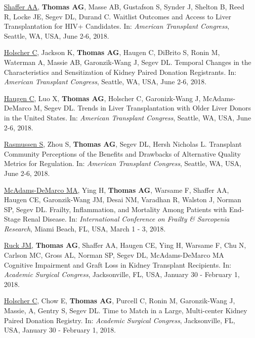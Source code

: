 \documentclass[10pt]{article}
\makeatletter
\newlength{\bibhang}
\newlength{\bibsep}
 {\@listi \global\bibsep\itemsep \global\advance\bibsep by\parsep}
\newenvironment{bibenum*}
  {\renewcommand\labelenumi{[\theenumi]}%
   \etaremune[
     topsep=0pt,
     itemsep=\bibsep,
     parsep=0pt,partopsep=0pt,
     itemindent=-\bibhang,
     leftmargin={\bibhang+\widthof{[999]}}]}
  {\endetaremune}
\makeatother
\begin{document}
\begin{bibenum*}
\item \underline{Shaffer AA}, \textbf{Thomas AG}, Masse AB, Gustafson S,
  Synder J, Shelton B, Reed R, Locke JE, Segev DL, Durand C.
  Waitlist Outcomes and Access to Liver Transplantation for HIV+ Candidates.
  In: \emph{American Transplant Congress},
  Seattle, WA, USA, June 2-6, 2018.

\item \underline{Holscher C}, Jackson K, \textbf{Thomas AG}, Haugen C,
  DiBrito S, Ronin M, Waterman A, Massie AB, Garonzik-Wang J, Segev DL.
  Temporal Changes in the Characteristics and
  Sensitization of Kidney Paired Donation Registrants.
  In: \emph{American Transplant Congress},
  Seattle, WA, USA, June 2-6, 2018.

\item \underline{Haugen C}, Luo X, \textbf{Thomas AG}, Holscher C,
  Garonizk-Wang J, McAdams-DeMarco M, Segev DL.
  Trends in Liver Transplantation with Older Liver
  Donors in the United States.
  In: \emph{American Transplant Congress},
  Seattle, WA, USA, June 2-6, 2018.

\item \underline{Rasmussen S}, Zhou S, \textbf{Thomas AG},
  Segev DL, Hersh Nicholas L. Transplant Community Perceptions
  of the Benefits and Drawbacks of Alternative Quality Metrics
  for Regulation.
  In: \emph{American Transplant Congress},
  Seattle, WA, USA, June 2-6, 2018.

\item \underline{McAdams-DeMarco MA}, Ying H, \textbf{Thomas AG},
  Warsame F, Shaffer AA, Haugen CE, Garonzik-Wang JM, Desai NM,
  Varadhan R, Walston J, Norman SP, Segev DL.
  Frailty, Inflammation, and Mortality Among
  Patients with End-Stage Renal Disease.
  In: \emph{International Conference on Frailty \& Sarcopenia Research},
  Miami Beach, FL, USA, March 1 - 3, 2018.

\item \underline{Ruck JM\dag}, \textbf{Thomas AG\dag}, Shaffer AA,
  Haugen CE, Ying H, Warsame F, Chu N, Carlson MC, Gross AL,
  Norman SP, Segev DL, McAdams-DeMarco MA
  Cognitive Impairment and Graft Loss
  in Kidney Transplant Recipients.
  In: \emph{Academic Surgical Congress},
  Jacksonville, FL, USA, January 30 - February 1, 2018.

\item \underline{Holscher C}, Chow E, \textbf{Thomas AG}, Purcell C,
  Ronin M, Garonzik-Wang J, Massie, A, Gentry S, Segev DL.
  Time to Match in a Large, Multi-center
  Kidney Paired Donation Registry.
  In: \emph{Academic Surgical Congress},
  Jacksonville, FL, USA, January 30 - February 1, 2018.


\end{bibenum*}
\end{document}
